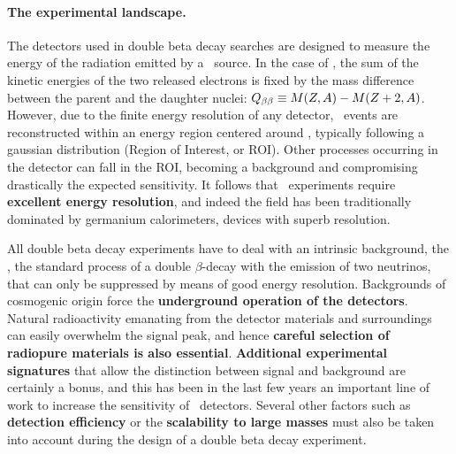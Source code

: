 \paragraph{The experimental landscape.}
The detectors used in double beta decay searches are designed to measure the energy of the radiation emitted by a \bb\ source. In the case of \bbonu, the sum of the kinetic energies of the two released electrons is fixed by the mass difference between the parent and the daughter nuclei: $Q_{\beta\beta} \equiv M(Z,A)-M(Z+2,A)$. However, due to the finite energy resolution of any detector, \bbonu\ events are reconstructed within an energy region centered around \Qbb, typically following a gaussian distribution (Region of Interest, or ROI). Other processes occurring in the detector can fall in the ROI, becoming a background and compromising drastically the expected sensitivity. It follows that \bbonu\ experiments require {\bf excellent energy resolution}, and indeed the field has been traditionally dominated by germanium calorimeters, devices with superb resolution.

All double beta decay experiments have to deal with an intrinsic background, the \bbtnu, the standard process of a double $\beta$-decay with the emission of two neutrinos, that can only be suppressed by means of good energy resolution. Backgrounds of cosmogenic origin force the {\bf underground operation of the detectors}. Natural radioactivity emanating from the detector materials and surroundings can easily overwhelm the signal peak, and hence {\bf careful selection of radiopure materials is also essential}. {\bf Additional experimental signatures} that allow the distinction between signal and background are certainly a bonus, and this has been in the last few years an important line of work to increase the sensitivity of \bbonu\ detectors. Several other factors such as {\bf detection efficiency} or the {\bf scalability to large masses} must also be taken into account during the design of a double beta decay experiment.
 
